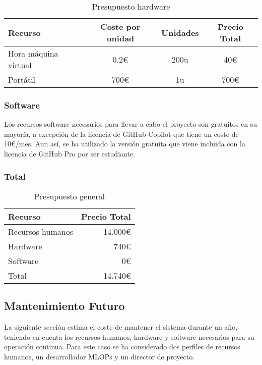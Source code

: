 \begin{table}[ht]
    \centering
    \begin{tabular}[ht]{l|c|c|c}
        \textbf{Recurso}     & \textbf{Coste por unidad} & \textbf{Unidades} & \textbf{Precio Total} \\
        \hline
        Hora máquina virtual & 0.2\euro                  & 200u              & 40\euro               \\
        Portátil             & 700\euro                  & 1u                & 700\euro              \\
    \end{tabular}
    \caption{Presupuesto hardware}
    \label{tab:hardware-budget}
\end{table}

\subsubsection{Software}
Los recursos software necesarios para llevar a cabo el proyecto son gratuitos
en su mayoría, a excepción de la licencia de GitHub Copilot que tiene un coste
de 10\euro/mes. Aun así, se ha utilizado la versión gratuita que viene incluida
con la licencia de GitHub Pro por ser estudiante.

\subsubsection{Total}
\begin{table}
    \centering
    \begin{tabular}[ht]{l|r}
        \textbf{Recurso} & \textbf{Precio Total} \\
        \hline
        Recursos humanos & 14.000\euro           \\
        Hardware         & 740\euro              \\
        Software         & 0\euro                \\
        \hline
        Total            & 14.740\euro           \\
    \end{tabular}
    \caption{Presupuesto general}
    \label{tab:total-budget}
\end{table}

\subsection{Mantenimiento Futuro}
La siguiente sección estima el coste de mantener el sistema durante un año, teniendo 
en cuenta los recursos humanos, hardware y software necesarios para su operación continua.
Para este caso se ha considerado dos perfiles de recursos humanos, un desarrollador MLOPs
y un director de proyecto. 

